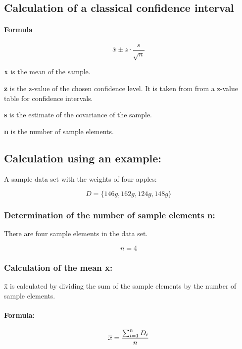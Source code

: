 \documentclass[a4paper,13pt,twoside]{book}
\begin{document}
\subsection{Calculation of a classical confidence interval}

\paragraph{Formula}

$$
\overline{x} \pm 
z \cdot
\frac{s}{\sqrt{n}}
$$

\textbf{x̄} is the mean of the sample.

\textbf{z} is the z-value of the chosen confidence level. It is taken from from a z-value table for confidence intervals.

\textbf{s} is the estimate of the covariance of the sample.

\textbf{n} is the number of sample elements.



\subsection{Calculation using an example:}

A sample data set with the weights of four apples: 

$$D = \{146 g, 162 g, 124 g, 148 g\}$$



\subsubsection{Determination of the number of sample elements n:}

There are four sample elements in the data set.

$$
n = 4
$$



\subsubsection{Calculation of the mean x̄:}

x̄ is calculated by dividing the sum of the sample elements by the number of sample elements.

\paragraph{Formula:}

$$
\overline{x} =
\frac
{\sum_{i=1}^{\\n} D_i}
{n}
$$
\end{document}
